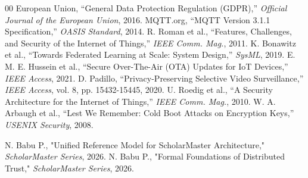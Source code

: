 \documentclass[conference]{IEEEtran}
\begin{document}
\begin{thebibliography}{00}
 European Union, ``General Data Protection Regulation (GDPR),'' \textit{Official Journal of the European Union}, 2016.
 MQTT.org, ``MQTT Version 3.1.1 Specification,'' \textit{OASIS Standard}, 2014.
 R. Roman et al., ``Features, Challenges, and Security of the Internet of Things,'' \textit{IEEE Comm. Mag.}, 2011.
 K. Bonawitz et al., ``Towards Federated Learning at Scale: System Design,'' \textit{SysML}, 2019.
 E. M. E. Hussein et al., ``Secure Over-The-Air (OTA) Updates for IoT Devices,'' \textit{IEEE Access}, 2021.
 D. Padillo, ``Privacy-Preserving Selective Video Surveillance,'' \textit{IEEE Access}, vol. 8, pp. 15432-15445, 2020.
 U. Roedig et al., ``A Security Architecture for the Internet of Things,'' \textit{IEEE Comm. Mag.}, 2010.
 W. A. Arbaugh et al., ``Lest We Remember: Cold Boot Attacks on Encryption Keys,'' \textit{USENIX Security}, 2008.


 N. Babu P., "Unified Reference Model for ScholarMaster Architecture," \textit{ScholarMaster Series}, 2026.
 N. Babu P., "Formal Foundations of Distributed Trust," \textit{ScholarMaster Series}, 2026.
\end{thebibliography}
\end{document}
